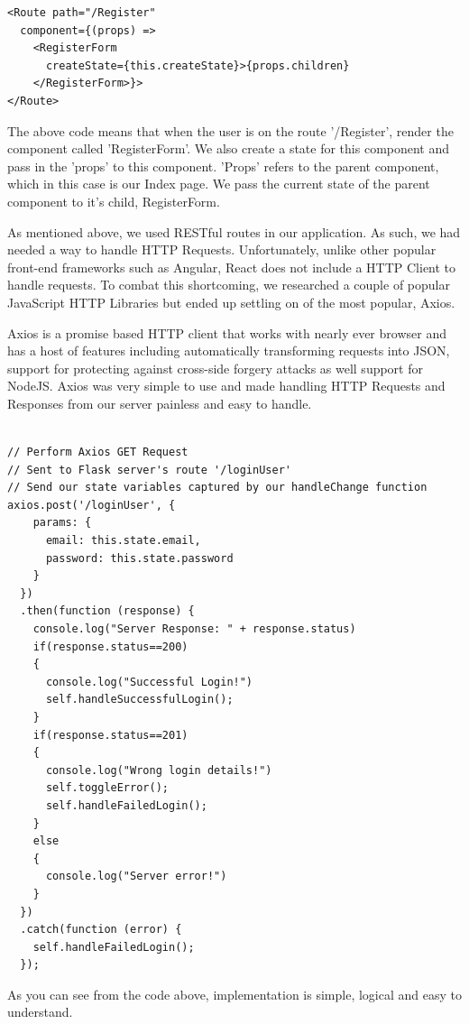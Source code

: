 \begin{verbatim}
<Route path="/Register" 
  component={(props) => 
    <RegisterForm 
      createState={this.createState}>{props.children}
    </RegisterForm>}>
</Route>
\end{verbatim}

The above code means that when the user is on the route '/Register', render the component called 'RegisterForm'. We also create a state for this component and pass in the 'props' to this component.
'Props' refers to the parent component, which in this case is our Index page. We pass the current state of the parent component to it's child, RegisterForm.

As mentioned above, we used RESTful routes in our application. As such, we had needed a way to handle HTTP Requests. Unfortunately, unlike other popular front-end frameworks such as Angular, React does not include a HTTP Client to handle requests.
To combat this shortcoming, we researched a couple of popular JavaScript HTTP Libraries but ended up settling on of the most popular, Axios. 

Axios is a promise based HTTP client that works with nearly ever browser and has a host of features including automatically transforming requests into JSON, support for protecting against cross-side forgery attacks as well support for NodeJS. Axios was very simple to use and made handling HTTP Requests and Responses from our server painless and easy to handle.

\newpage

\begin{verbatim}

// Perform Axios GET Request
// Sent to Flask server's route '/loginUser'
// Send our state variables captured by our handleChange function 
axios.post('/loginUser', {
    params: {
      email: this.state.email,
      password: this.state.password
    }
  })
  .then(function (response) {
    console.log("Server Response: " + response.status)
    if(response.status==200)
    {
      console.log("Successful Login!")
      self.handleSuccessfulLogin();
    }
    if(response.status==201)
    {
      console.log("Wrong login details!")
      self.toggleError();
      self.handleFailedLogin();
    }
    else
    {
      console.log("Server error!")
    }
  })
  .catch(function (error) {
    self.handleFailedLogin();
  });  
\end{verbatim}

As you can see from the code above, implementation is simple, logical and easy to understand.


